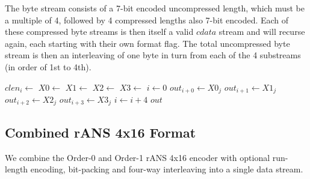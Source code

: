 \documentclass[a4paper]{article}
\begin{document}
The byte stream consists of a 7-bit encoded uncompressed length, which
must be a multiple of 4, followed by 4 compressed lengths also 7-bit
encoded.  Each of these compressed byte streams is then itself a valid
$cdata$ stream and will recurse again, each starting with their own
format flag.  The total uncompressed byte stream is then an
interleaving of one byte in turn from each of the 4 substreams (in
order of 1st to 4th).

\begin{algorithmic}[1]
   
    \State $clen_i \gets $
  \EndFor
  \State $X0 \gets $ 
  \State $X1 \gets $
  \State $X2 \gets $
  \State $X3 \gets $
  \Statex
  \State $i \gets 0$
   
    \State $out_{i+0} \gets X0_j$
    \State $out_{i+1} \gets X1_j$
    \State $out_{i+2} \gets X2_j$
    \State $out_{i+3} \gets X3_j$
    \State $i \gets i+4$
  \EndFor
  \State \Return $out$
\EndFunction
\end{algorithmic}

\subsection{Combined rANS 4x16 Format}

We combine the Order-0 and Order-1 rANS 4x16 encoder with optional
run-length encoding, bit-packing and four-way interleaving into a
single data stream.
\end{document}
